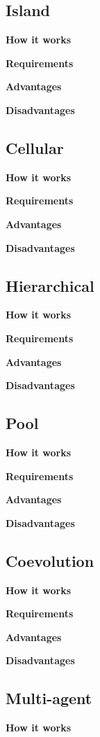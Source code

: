 \subsection{Island}

\textbf{How it works}

\textbf{Requirements}

\textbf{Advantages}

\textbf{Disadvantages}

\subsection{Cellular}

\textbf{How it works}

\textbf{Requirements}

\textbf{Advantages}

\textbf{Disadvantages}

\subsection{Hierarchical}

\textbf{How it works}

\textbf{Requirements}

\textbf{Advantages}

\textbf{Disadvantages}

\subsection{Pool}

\textbf{How it works}

\textbf{Requirements}

\textbf{Advantages}

\textbf{Disadvantages}

\subsection{Coevolution}

\textbf{How it works}

\textbf{Requirements}

\textbf{Advantages}

\textbf{Disadvantages}

\subsection{Multi-agent}

\textbf{How it works}

